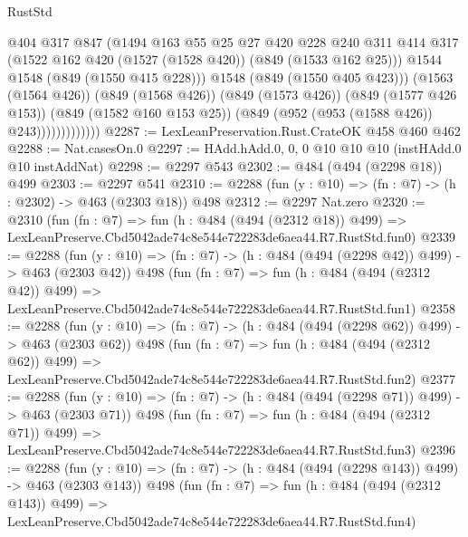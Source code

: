 \begin{lexlean}{RustStd}
\begin{coremodule}
                            @404
                            @317
                            @847
                            (@1494
                              @163
                              @55
                              @25
                              @27
                              @420
                              @228
                              @240
                              @311
                              @414
                              @317
                              (@1522 @162 @420 (@1527 (@1528 @420)) (@849 (@1533 @162 @25)))
                              @1544
                              @1548
                              (@849 (@1550 @415 @228)))
                            @1548
                            (@849 (@1550 @405 @423)))
                          (@1563 (@1564 @426))
                          (@849 (@1568 @426))
                          (@849 (@1573 @426))
                          (@849 (@1577 @426 @153))
                          (@849 (@1582 @160 @153 @25))
                          (@849 (@952 (@953 (@1588 @426)) @243)))))))))))))
@2287 := LexLeanPreservation.Rust.CrateOK @458 @460 @462
@2288 := Nat.casesOn.{0}
@2297 := HAdd.hAdd.{0, 0, 0} @10 @10 @10 (instHAdd.{0} @10 instAddNat)
@2298 := @2297 @543
@2302 := @484 (@494 (@2298 @18)) @499
@2303 := @2297 @541
@2310 := @2288 (fun (y : @10) => (fn : @7) -> (h : @2302) -> @463 (@2303 @18)) @498
@2312 := @2297 Nat.zero
@2320 := @2310
    (fun (fn : @7) =>
    fun (h : @484 (@494 (@2312 @18)) @499) =>
    LexLeanPreserve.Cbd5042ade74c8e544e722283de6aea44.R7.RustStd.fun0)
@2339 := @2288
    (fun (y : @10) => (fn : @7) -> (h : @484 (@494 (@2298 @42)) @499) -> @463 (@2303 @42))
    @498
    (fun (fn : @7) =>
    fun (h : @484 (@494 (@2312 @42)) @499) =>
    LexLeanPreserve.Cbd5042ade74c8e544e722283de6aea44.R7.RustStd.fun1)
@2358 := @2288
    (fun (y : @10) => (fn : @7) -> (h : @484 (@494 (@2298 @62)) @499) -> @463 (@2303 @62))
    @498
    (fun (fn : @7) =>
    fun (h : @484 (@494 (@2312 @62)) @499) =>
    LexLeanPreserve.Cbd5042ade74c8e544e722283de6aea44.R7.RustStd.fun2)
@2377 := @2288
    (fun (y : @10) => (fn : @7) -> (h : @484 (@494 (@2298 @71)) @499) -> @463 (@2303 @71))
    @498
    (fun (fn : @7) =>
    fun (h : @484 (@494 (@2312 @71)) @499) =>
    LexLeanPreserve.Cbd5042ade74c8e544e722283de6aea44.R7.RustStd.fun3)
@2396 := @2288
    (fun (y : @10) => (fn : @7) -> (h : @484 (@494 (@2298 @143)) @499) -> @463 (@2303 @143))
    @498
    (fun (fn : @7) =>
    fun (h : @484 (@494 (@2312 @143)) @499) =>
    LexLeanPreserve.Cbd5042ade74c8e544e722283de6aea44.R7.RustStd.fun4)

\end{coremodule}
\end{lexlean}
